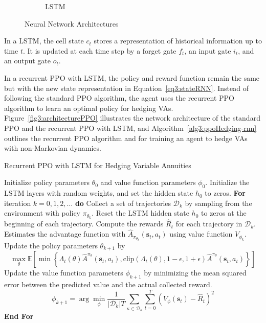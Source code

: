 \begin{figure}[ht!]
\begin{subfigure}{0.45\textwidth}
        \caption{LSTM}
        \label{subfig3:lstm}
    \end{subfigure}
    \caption{Neural Network Architectures}
    \label{fig3:nn}
\end{figure}

In a LSTM, the cell state $c_t$ stores a representation of historical information up to time $t$.
It is updated at each time step by a forget gate $f_t$, an input gate $i_t$, and an output gate $o_t$.

In a recurrent PPO with LSTM, the policy and reward function remain the same but with the new state representation in Equation~\ref{eq3:stateRNN}.
Instead of following the standard PPO algorithm, the agent uses the recurrent PPO algorithm to learn an optimal policy for hedging VAs.
Figure~\ref{fig3:architecturePPO} illustrates the network architecture of the standard PPO and the recurrent PPO with LSTM, and Algorithm~\ref{alg3:ppoHedging-rnn} outlines the recurrent PPO algorithm and for training an agent to hedge VAs with non-Markovian dynamics.

\begin{algorithm}
    \caption{Recurrent PPO with LSTM for Hedging Variable Annuities} 
    \begin{algorithmic}[1] \label{alg3:ppoHedging-rnn}
        \STATE  Initialize policy parameters $\theta_0$ and value function parameters $\phi_0$.
        \STATE  Initialize the LSTM layers with random weights, and set the hidden state $h_0$ to zeros.
        \STATE  \textbf{For} {iteration $k=0, 1,2,\ldots$} \textbf{do}
        \STATE  \quad Collect a set of trajectories $\mathcal{D}_k$ by sampling from the environment with policy $\pi_{\theta_{k}}$.
        \STATE  \quad Reset the LSTM hidden state $h_0$ to zeros at the beginning of each trajectory.
        \STATE  \quad Compute the rewards $\hat{R}_t$ for each trajectory in $\mathcal{D}_k$.
        \STATE  \quad Estimates the advantage function with $\hat{A}_{\pi_{\theta_k}}(\mathbf{s}_t, a_t)$ using value function $V_{\phi_k}$.
        \STATE  \quad Update the policy parameters $\theta_{k+1}$ by 
        \begin{equation*}
            \max_{\theta} \mathbb{E}\left[ \min \left\{ \Lambda_t(\theta)\hat{A}^{\pi_{\theta}}(\mathbf{s}_t, a_t), \text{clip}(\Lambda_t(\theta), 1-\epsilon, 1 + \epsilon) \hat{A}^{\pi_{\theta}}(\mathbf{s}_t, a_t)  \right\} \right]
        \end{equation*}
        \STATE  \quad Update the value function parameters $\phi_{k+1}$ by minimizing the mean squared error between the predicted value and the actual collected reward.
        \begin{equation*}
            \phi_{k+1} = \arg \min_{\phi} \frac{1}{|\mathcal{D}_k|T} \sum_{\mathcal{\kappa} \in \mathcal{D}_k} \sum_{t=0}^{T} \left( V_{\phi}(\mathbf{s}_t) - \hat{R}_t \right)^2
        \end{equation*}
        \STATE  \textbf{End For}
    \end{algorithmic}
\end{algorithm}

